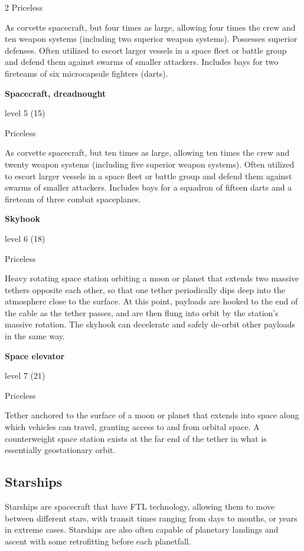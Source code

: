\begin{multicols}{2}
Priceless 

As corvette spacecraft, but four times as large, allowing four times the crew and ten weapon systems (including two superior weapon systems). Possesses superior defenses. Often utilized to escort larger vessels in a space fleet or battle group and defend them against swarms of smaller attackers. Includes bays for two fireteams of six microcapsule fighters (darts). 

\textbf{Spacecraft, dreadnought} 

level 5 (15) 

Priceless 

As corvette spacecraft, but ten times as large, allowing ten times the crew and twenty weapon systems (including five superior weapon systems). Often utilized to escort larger vessels in a space fleet or battle group and defend them against swarms of smaller attackers. Includes bays for a squadron of fifteen darts and a fireteam of three combat spaceplanes. 

\textbf{Skyhook}

level 6 (18) 

Priceless 

Heavy rotating space station orbiting a moon or planet that extends two massive tethers opposite each other, so that one tether periodically dips deep into the atmosphere close to the surface. At this point, payloads are hooked to the end of the cable as the tether passes, and are then flung into orbit by the station’s massive rotation. The skyhook can decelerate and safely de-orbit other payloads in the same way.

\textbf{Space elevator}

level 7 (21) 

Priceless 

Tether anchored to the surface of a moon or planet that extends into space along which vehicles can travel, granting access to and from orbital space. A counterweight space station exists at the far end of the tether in what is essentially geostationary orbit.

\subsection{Starships}

Starships are spacecraft that have FTL technology, allowing them to move between different stars, with transit times ranging from days to months, or years in extreme cases. Starships are also often capable of planetary landings and ascent with some retrofitting before each planetfall.


\end{multicols}
